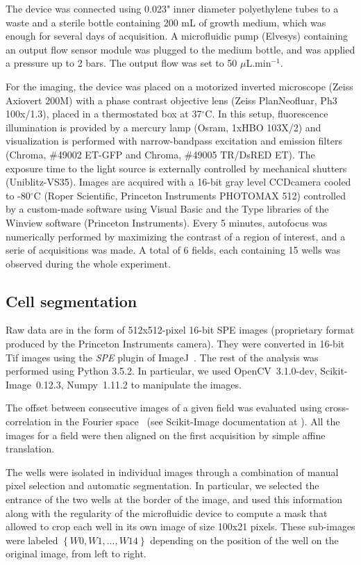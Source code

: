 The device was connected using 0.023" inner diameter polyethylene tubes to a waste and a sterile bottle containing 200 mL of growth medium, which was enough for several days of acquisition.
A microfluidic pump (Elvesys) containing an output flow sensor module was plugged to the medium bottle, and was applied a pressure up to 2 bars.
The output flow was set to 50 $\mu$L.min$^{-1}$.

For the imaging, the device was placed on a motorized inverted microscope (Zeiss Axiovert 200M) with a phase contrast objective lens (Zeiss PlanNeofluar, Ph3 100x/1.3), placed in a thermostated box at 37$^\circ$C.
In this setup, fluorescence illumination is provided by a mercury lamp (Osram, 1xHBO 103X/2) and visualization is performed with narrow-bandpass excitation and emission filters (Chroma, \#49002 ET-GFP and Chroma, \#49005 TR/DsRED ET).
The exposure time to the light source is externally controlled by mechanical shutters (Uniblitz-VS35).
Images are acquired with a 16-bit gray level CCDcamera cooled to -80$^\circ$C (Roper Scientific, Princeton Instruments PHOTOMAX 512) controlled by a custom-made software using Visual Basic and the Type libraries of the Winview software (Princeton Instruments).
Every 5 minutes, autofocus was numerically performed by maximizing the contrast of a region of interest, and a serie of acquisitions was made.
A total of 6 fields, each containing 15 wells was observed during the whole experiment.

\subsection{Cell segmentation}
\label{sec:cell_segmentation}

Raw data are in the form of 512x512-pixel 16-bit SPE images (proprietary format produced by the Princeton Instruments camera).
They were converted in 16-bit Tif images using the \textit{SPE} plugin of ImageJ~\cite{goto_open_2005}.
The rest of the analysis was performed using Python 3.5.2.
In particular, we used OpenCV~3.1.0-dev, Scikit-Image~0.12.3, Numpy~1.11.2 to manipulate the images.

The offset between consecutive images of a given field was evaluated using cross-correlation in the Fourier space~\cite{guizar-sicairos_efficient_2008} (see Scikit-Image documentation at \cite{skimage_cross-correlation}).
All the images for a field were then aligned on the first acquisition by simple affine translation.

The wells were isolated in individual images through a combination of manual pixel selection and automatic segmentation.
In particular, we selected the entrance of the two wells at the border of the image, and used this information along with the regularity of the microfluidic device to compute a mask that allowed to crop each well in its own image of size 100x21 pixels.
These sub-images were labeled $\left\{W0, W1, ..., W14\right\}$ depending on the position of the well on the original image, from left to right.

